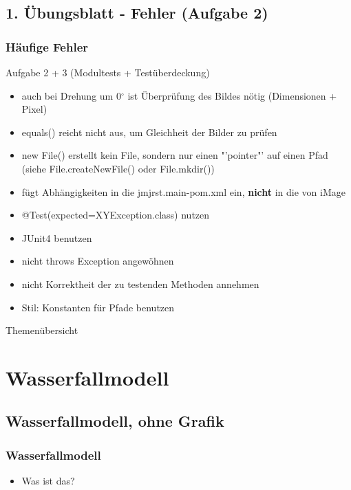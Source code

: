 \documentclass[18pt]{beamer}
\begin{document}
	\subsection{1. Übungsblatt - Fehler (Aufgabe 2)}
	\begin{frame}
		\frametitle{Häufige Fehler}
		\begin{block}{Aufgabe 2 + 3 (Modultests + Testüberdeckung)}
			\begin{itemize}
				\item auch bei Drehung um 0$^{\circ}$  ist Überprüfung des Bildes nötig (Dimensionen + Pixel) \pause
				\item equals() reicht nicht aus, um Gleichheit der Bilder zu prüfen \pause 
				\item new File() erstellt kein File, sondern nur einen "'pointer"' auf einen Pfad (siehe File.createNewFile() oder File.mkdir()) \pause
				\item fügt Abhängigkeiten in die jmjrst.main-pom.xml ein, \textbf{nicht} in die von iMage \pause
				\item @Test(expected=XYException.class) nutzen \pause
				\item JUnit4 benutzen \pause
				\item nicht throws Exception angewöhnen \pause
				\item nicht Korrektheit der zu testenden Methoden annehmen \pause
				\item Stil: Konstanten für Pfade benutzen
			\end{itemize}
		\end{block}
	\end{frame}

\begin{frame}{Themenübersicht}
\tableofcontents
\end{frame}

\section{Wasserfallmodell}
	\subsection{Wasserfallmodell, ohne Grafik}
	\begin{frame}
		\frametitle{Wasserfallmodell}
		\begin{itemize}
			\item Was ist das? 
		\end{itemize}
	\end{frame}
	
\end{document}
